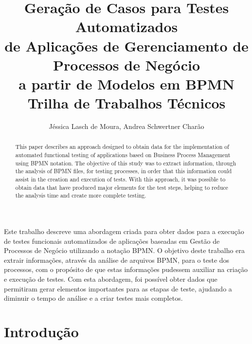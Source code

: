 \documentclass[12pt]{article}
\title{Geração de Casos para Testes Automatizados\\ de Aplicações de Gerenciamento de Processos de Negócio\\ a partir de Modelos em BPMN\\\vspace{0.5cm} \small{Trilha de Trabalhos Técnicos}}
\author{Jéssica Lasch de Moura\inst{1}, Andrea Schwertner Charão\inst{1}}
\begin{document}
 

\maketitle

\begin{abstract}

This paper describes an approach designed to obtain data for the implementation of automated functional testing of applications based on Business Process Management using BPMN notation. The objective of this study was to extract information, through the analysis of BPMN files, for testing processes, in order that this information could assist in the creation and execution of tests. With this approach, it was possible to obtain data that have produced major elements for the test steps, helping to reduce the analysis time and create more complete testing.
\end{abstract}
     
\begin{resumo} 

Este trabalho descreve uma abordagem criada para obter dados para a execução de testes funcionais automatizados de aplicações baseadas em Gestão de Processos de Negócio utilizando a notação BPMN. O objetivo deste trabalho era extrair informações, através da análise de arquivos BPMN, para o teste dos processos, com o propósito de que estas informações pudessem auxiliar na criação e execução de testes. Com esta abordagem, foi possível obter dados que permitiram gerar elementos importantes para as etapas de teste, ajudando a diminuir o tempo de análise e a criar testes mais completos.

\end{resumo}

\section{Introdução}
\end{document}
